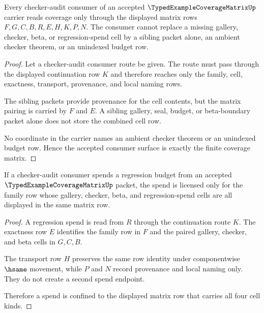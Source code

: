 \begin{theorem}
\label{thm:typed-example-coverage-matrix-nonescape}
Every checker-audit consumer of an accepted $\TypedExampleCoverageMatrixUp$ carrier reads coverage only through the displayed matrix rows $F,G,C,B,R,E,H,K,P,N$. The consumer cannot replace a missing gallery, checker, beta, or regression-spend cell by a sibling packet alone, an ambient checker theorem, or an unindexed budget row.
\end{theorem}
\begin{proof}
Let a checker-audit consumer route be given. The route must pass through the displayed continuation row $K$ and therefore reaches only the family, cell, exactness, transport, provenance, and local naming rows.

The sibling packets provide provenance for the cell contents, but the matrix pairing is carried by $F$ and $E$. A sibling gallery, seal, budget, or beta-boundary packet alone does not store the combined cell row.

No coordinate in the carrier names an ambient checker theorem or an unindexed budget row. Hence the accepted consumer surface is exactly the finite coverage matrix.
\end{proof}

\begin{theorem}
\label{thm:typed-example-coverage-matrix-spend-boundary}
If a checker-audit consumer spends a regression budget from an accepted $\TypedExampleCoverageMatrixUp$ packet, the spend is licensed only for the family row whose gallery, checker, beta, and regression-spend cells are all displayed in the same matrix row.
\end{theorem}
\begin{proof}
A regression spend is read from $R$ through the continuation route $K$. The exactness row $E$ identifies the family row in $F$ and the paired gallery, checker, and beta cells in $G,C,B$.

The transport row $H$ preserves the same row identity under componentwise $\hsame$ movement, while $P$ and $N$ record provenance and local naming only. They do not create a second spend endpoint.

Therefore a spend is confined to the displayed matrix row that carries all four cell kinds.
\end{proof}

